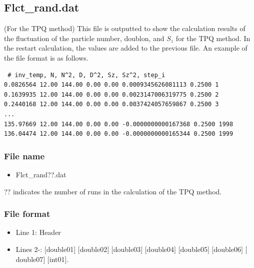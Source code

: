 \newpage
\subsection{Flct\_rand.dat}
\label{Subsec:flctrand}
(For the TPQ method) This file is outputted to show the calculation results of the fluctuation of the particle number, doublon, and $S_z$ for the TPQ method.
In the restart calculation, the values are added to the previous file.
An example of the file format is as follows.\\

\begin{minipage}{15cm}
\begin{screen}
\begin{verbatim}
 # inv_temp, N, N^2, D, D^2, Sz, Sz^2, step_i
0.0826564 12.00 144.00 0.00 0.00 0.0009345626081113 0.2500 1
0.1639935 12.00 144.00 0.00 0.00 0.0023147006319775 0.2500 2
0.2440168 12.00 144.00 0.00 0.00 0.0037424057659867 0.2500 3
...
135.97669 12.00 144.00 0.00 0.00 -0.0000000000167368 0.2500 1998
136.04474 12.00 144.00 0.00 0.00 -0.0000000000165344 0.2500 1999
\end{verbatim}
\end{screen}
\end{minipage}

\subsubsection{File name}
 \begin{itemize}
   \item Flct\_rand??.dat
  \end{itemize}
  ?? indicates the number of runs in the calculation of the TPQ method.

\subsubsection{File format}
\begin{itemize}
   \item Line 1: Header
   \item Lines 2-: $[$double01$]$ $[$double02$]$ $[$double03$]$ $[$double04$]$ $[$double05$]$ $[$double06$]$ $[$double07$]$ $[$int01$]$.
  \end{itemize}

